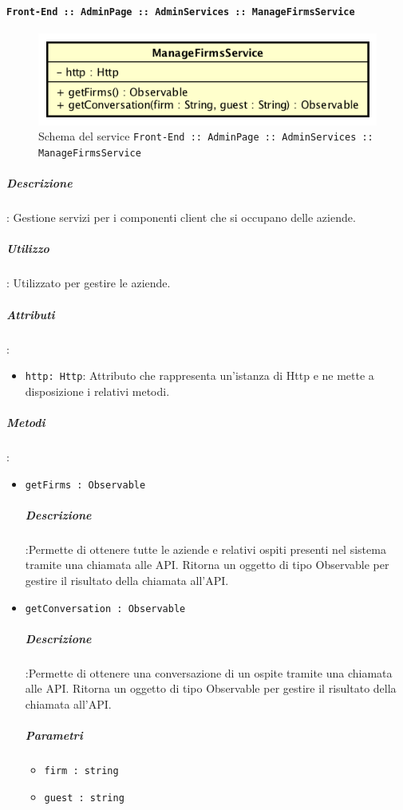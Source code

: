 \documentclass[../DefinizioneDiProdotto_v2.0.0.tex]{subfiles}
\begin{document}
\newpage
		      	\paragraph{\texttt{Front-End :: AdminPage :: AdminServices :: ManageFirmsService}}
		      	\acapo
				\begin{figure}[!h]
					\centering
					\includegraphics[scale=0.6]{Architettura/Front-End/AdminPage/AdminServices/ManageFirmsService.png}
					\caption{Schema del service \texttt{Front-End :: AdminPage :: AdminServices :: ManageFirmsService}}
				\end{figure}
			      	\subparagraph{Descrizione}: Gestione servizi per i componenti client che si occupano delle aziende.
			      	\subparagraph{Utilizzo}: Utilizzato per gestire le aziende.
			      	\subparagraph{Attributi}:
      	      		\begin{itemize}
						\item \texttt{http: Http}: Attributo che rappresenta un'istanza di Http e ne mette a disposizione i relativi metodi.
	      	      	\end{itemize}
			      	\subparagraph{Metodi}:
	      	      	\begin{itemize}
						\item \texttt{getFirms : Observable}
						\subparagraph{Descrizione}:Permette di ottenere tutte le aziende e relativi ospiti presenti nel sistema tramite una chiamata alle API. Ritorna un oggetto di tipo Observable per gestire il risultato della chiamata all'API.
						\item \texttt{getConversation : Observable}
						\subparagraph{Descrizione}:Permette di ottenere una conversazione di un ospite tramite una chiamata alle API. Ritorna un oggetto di tipo Observable per gestire il risultato della chiamata all'API.
						\subparagraph{Parametri}\begin{itemize}
							\item \texttt{firm : string}
							\item \texttt{guest : string}
						\end{itemize}
	      	      	\end{itemize}
\end{document}

